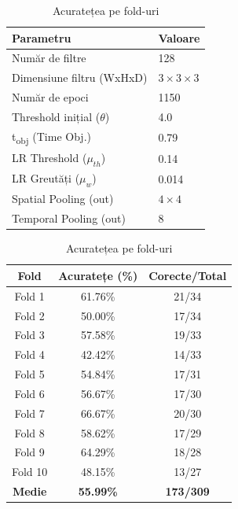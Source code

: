 \begin{table}[h!]
	\centering
	\small
	
	\begin{minipage}[t]{0.43\textwidth}
		\centering
		\caption{Hiper-parametrii rețelei SNN}
		\label{tab:hiperparametri}
		\vspace{2mm}
		\setlength{\tabcolsep}{3pt}
		\begin{tabular}{ll}
			\toprule
			\textbf{Parametru} & \textbf{Valoare} \\ \midrule
			Număr de filtre & 128 \\
			Dimensiune filtru (WxHxD) & $3 \times 3 \times 3$ \\
			Număr de epoci & 1150 \\
			Threshold inițial ($\theta$) & 4.0 \\
			t\textsubscript{obj} (Time Obj.) & 0.79 \\
			LR Threshold ($\mu_{th}$) & 0.14 \\
			LR Greutăți ($\mu_{w}$) & 0.014 \\
			Spatial Pooling (out) & $4 \times 4$ \\
			Temporal Pooling (out) & 8 \\
			\bottomrule
		\end{tabular}
	\end{minipage}
	\hfill %
	\begin{minipage}[t]{0.53\textwidth}
		\centering
		\caption{Acuratețea pe fold-uri}
		\label{tab:rezultate_folds}
		\vspace{2mm}
		\setlength{\tabcolsep}{4pt}
		\begin{tabular}{@{}ccc@{}}
			\toprule
			\textbf{Fold} & \textbf{Acuratețe (\%)} & \textbf{Corecte/Total} \\ \midrule
			Fold 1 & 61.76\% & 21/34 \\
			Fold 2 & 50.00\% & 17/34 \\
			Fold 3 & 57.58\% & 19/33 \\
			Fold 4 & 42.42\% & 14/33 \\
			Fold 5 & 54.84\% & 17/31 \\
			Fold 6 & 56.67\% & 17/30 \\
			Fold 7 & 66.67\% & 20/30 \\
			Fold 8 & 58.62\% & 17/29 \\
			Fold 9 & 64.29\% & 18/28 \\
			Fold 10 & 48.15\% & 13/27 \\ \midrule
			\textbf{Medie} & \textbf{55.99\%} & \textbf{173/309} \\ \bottomrule
		\end{tabular}
	\end{minipage}
\end{table}

